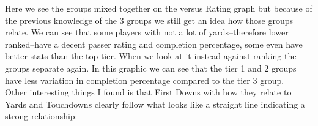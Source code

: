 \documentclass[10pt]{article}
\begin{document}
\hfill
{}%
\par
Here we see the groups mixed together on the versus Rating graph but because of the previous knowledge of the 3 groups we still get an idea how those groups relate. We can see that some players with not a lot of yards--therefore lower ranked--have a decent passer rating and completion percentage, some even have better stats than the top tier. When we look at it instead against ranking the groups separate again. In this graphic we can see that the tier 1 and 2 groups have less variation in completion percentage compared to the tier 3 group.\\
Other interesting things I found is that First Downs with how they relate to Yards and Touchdowns clearly follow what looks like a straight line indicating a strong relationship:
\pagebreak
\par
{}%
\hfill
{}%
\end{document}
